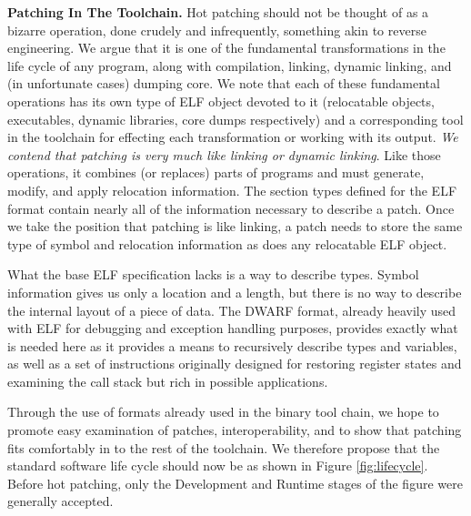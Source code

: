{\bf Patching In The Toolchain.}
\label{ssec:patchingvlinking}
Hot patching should not be thought of as a bizarre operation, done
crudely and infrequently, something akin to reverse engineering. We
argue that it is one of the fundamental transformations in the life
cycle of any program, along with compilation, linking, dynamic
linking, and (in unfortunate cases) dumping core. We note that each of
these fundamental operations has its own type of ELF object devoted to
it (relocatable objects, executables, dynamic libraries, core dumps
respectively) and a corresponding tool in the toolchain for effecting
each transformation or working with its output. \emph{We contend that
  patching is very much like linking or dynamic linking}. Like those
operations, it combines (or replaces) parts of programs and must
generate, modify, and apply relocation information. The section types
defined for the ELF format contain nearly all of the information
necessary to describe a patch. Once we take the position that patching
is like linking, a patch needs to store the same type of symbol and
relocation information as does any relocatable ELF object.

What the base ELF specification lacks is a way to describe
types. Symbol information gives us only a location and a length, but
there is no way to describe the internal layout of a piece of
data. The DWARF format, already heavily used with ELF for debugging
and exception handling purposes, provides exactly what is needed here
as it provides a means to recursively describe types and variables, as
well as a set of instructions originally designed for restoring
register states and examining the call stack but rich in possible
applications. 

Through the use of formats already used in the binary tool chain, we
hope to promote easy examination of patches, interoperability, and to
show that patching fits comfortably in to the rest of the
toolchain. We therefore propose that the standard software life cycle
should now be as shown in Figure \ref{fig:lifecycle}. Before hot
patching, only the Development and Runtime stages of the figure were
generally accepted.

